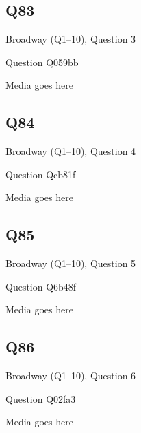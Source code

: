 \documentclass[11pt]{beamer}
\begin{document}
\subsection*{Q83}
\begin{frame}[t]{Broadway (Q1--10), Question 3}
\vspace{2em}
\begin{block}{Question}
Q059bb
\end{block}
\begin{center}
Media goes here
\end{center}
\end{frame}
    

\subsection*{Q84}
\begin{frame}[t]{Broadway (Q1--10), Question 4}
\vspace{2em}
\begin{block}{Question}
Qcb81f
\end{block}
\begin{center}
Media goes here
\end{center}
\end{frame}
    

\subsection*{Q85}
\begin{frame}[t]{Broadway (Q1--10), Question 5}
\vspace{2em}
\begin{block}{Question}
Q6b48f
\end{block}
\begin{center}
Media goes here
\end{center}
\end{frame}
    

\subsection*{Q86}
\begin{frame}[t]{Broadway (Q1--10), Question 6}
\vspace{2em}
\begin{block}{Question}
Q02fa3
\end{block}
\begin{center}
Media goes here
\end{center}
\end{frame}
    
\end{document}

